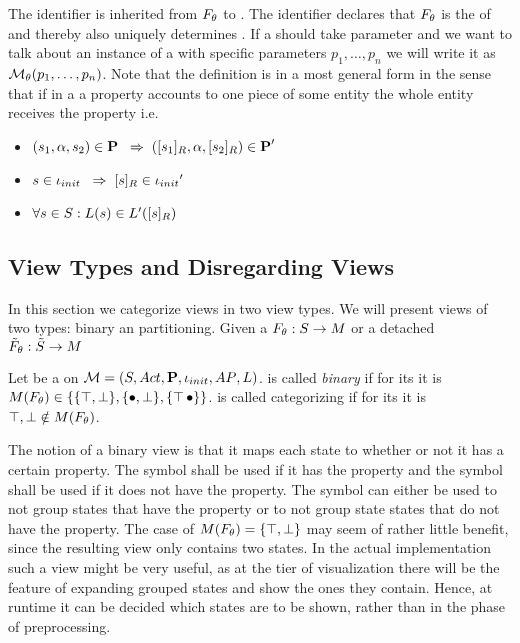 \documentclass[preview]{standalone}
\begin{document}
The identifier \viewppty is inherited from ${F_{{\theta}}}$ to \view. The identifier declares that ${F_{{\theta}}}$ is the \grpfctN of \view and thereby also uniquely determines \view. If a \viewN should take parameter and we want to talk about an instance of a \viewN with specific parameters $p_1, \dots, p_n$ we will write it as ${{{{\mathcal{M}}}}_{{\theta}}}(p_1, \dots, p_n)$. Note that the definition is in a most general form in the sense that if in a \viewN a property accounts to one piece of some entity the whole entity receives the property i.e. 
\begin{itemize}	
	\item $({s}_1, {\alpha}, {s}_2) \in {\ensuremath{{\textbf{P}}}} {\hspace{3mm}\Rightarrow\hspace{2mm}} ({{[{s}_1]_{{R}}}}, {\alpha}, {{[{s}_2]_{{R}}}}) \in {\ensuremath{{\textbf{P}}}}'$
	\item ${s} \in {\ensuremath{{\iota_{init}}}} {\hspace{3mm}\Rightarrow\hspace{2mm}} {\ensuremath{{[{s}]_{{R}}}}} \in {\iota_{init}}'$
	\item $\forall {s} \in {S} : {L}({s}) \in {L}'({{[{s}]_{{R}}}})$
\end{itemize}

\subsection{View Types and Disregarding Views}
In this section we categorize views in two view types. We will present views of two types: binary an partitioning. Given a \grpfctN ${F_{{\theta}}} : {S} \to {\ensuremath{{M}}}$ or a detached \grpfctN ${\tilde{F}_{{\theta}}} : {\tilde{{S}}} \to {\ensuremath{{M}}}$

\begin{definition}
	Let \view be a \viewN on \achgphN ${{{\mathcal{M}}}} = {{({S}, {Act}, {\textbf{P}}, {\iota_{init}}, {AP}, {L})}}$. \view is called \emph{binary} if for its \grpfctN \grpfct it is $M({F_{{\theta}}}) \in \{\{{\top}, {\bot}\}, \{{\bullet}, {\bot}\}, \{{\top}\, {\bullet}\}\}$. \view is called categorizing if for its \grpfctN \grpfct it  is ${\top}, {\bot} \notin M({F_{{\theta}}})$.%
	\label{def:viewtypes}
\end{definition}

The notion of a binary view is that it maps each state to whether or not it has a certain property. The symbol \hasppty shall be used if it has the property and the symbol \notppty shall be used if it does not have the property. The symbol \remelem can either be used to not group states that have the property or to not group state states that do not have the property. The case of $M({F_{{\theta}}}) = \{{\top}, {\bot}\}$ may seem of rather little benefit, since the resulting view only contains two states. In the actual implementation such a view might be very useful, as at the tier of visualization there will be the feature of expanding grouped states and show the ones they contain. Hence, at runtime it can be decided which states are to be shown, rather than in the phase of preprocessing.
\end{document}
